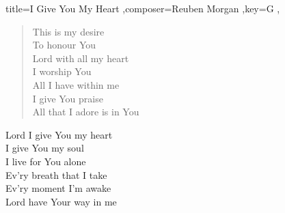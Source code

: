\documentclass[]{leadsheet}
\begin{document}
\begin{song}{title={I Give You My Heart
},composer={Reuben Morgan
},key={G
},}
\begin{verse}
This is my desire \\
To honour You \\
Lord with all my heart \\
I worship You \\
All I have within me \\
I give You praise \\
All that I adore is in You \\
\end{verse}

\begin{chorus}
Lord I give You my heart \\
I give You my soul \\
I live for You alone \\
Ev'ry breath that I take \\
Ev'ry moment I'm awake \\
Lord have Your way in me \\
\end{chorus}

\end{song}
\end{document}
